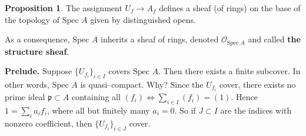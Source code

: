\documentclass{article}
\theoremstyle{definition}
\newtheorem{prop}[theorem]{Proposition}
\begin{document}
\begin{prop}
    The assignment $U_f \to A_f$ defines a sheaf (of rings) on the base of the topology of $\text{Spec }A$ given by distinguished opens.
    \vspace{1mm}
     
    As a consequence, $\text{Spec }A$ inherits a sheaf of rings, denoted $\mathcal{O}_{\text{Spec }A}$ and called \textbf{the structure sheaf}.
\end{prop}
\textbf{Prelude.} Suppose $\{U_{f_i}\}_{i \in I}$ covers $\text{Spec }A$. Then there exists a finite subcover. In other words, $\text{Spec }A$ is quasi--compact. Why? Since the $U_{f_i}$ cover, there exists no prime ideal $\mathfrak{p} \subset A$ containing all $(f_i) \iff \sum_{i \in I}^{} (f_i) = (1)$. Hence $ 1 = \sum_{i}^{} a_i f_i$, where all but finitely many $a_i=0$. So if $J \subset I$ are the indices with nonzero coefficient, then $\{U_{f_i}\}_{i \in J}$ cover. 
\end{document}
